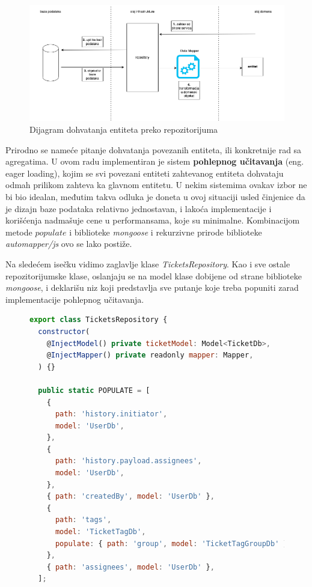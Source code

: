 \documentclass[12pt,oneside]{memoir}
\begin{document}
\begin{figure}[h]
  \centering
  \includegraphics[width=1\textwidth]{docs/images/ch_2/repository.png} 
  \caption{Dijagram dohvatanja entiteta preko repozitorijuma}
  \label{fig:sample}
\end{figure}

Prirodno se nameće pitanje dohvatanja povezanih entiteta, ili konkretnije rad sa agregatima. U ovom radu implementiran je sistem \textbf{pohlepnog učitavanja} (eng. eager loading), kojim se svi povezani entiteti zahtevanog entiteta dohvataju odmah prilikom zahteva ka glavnom entitetu. U nekim sistemima ovakav izbor ne bi bio idealan, međutim takva odluka je doneta u ovoj situaciji usled činjenice da je dizajn baze podataka relativno jednostavan, i lakoća implementacije i korišćenja nadmašuje cene u performansama, koje su minimalne. Kombinacijom metode $populate$ 
 i biblioteke \textit{mongoose} i rekurzivne prirode biblioteke \textit{automapper/js} ovo se lako postiže.

Na sledećem isečku vidimo zaglavlje klase \textit{TicketsRepository}. Kao i sve ostale repozitorijumske klase, oslanjaju se na model klase dobijene od strane biblioteke \textit{mongoose}, i deklarišu niz koji predstavlja sve putanje koje treba popuniti zarad implementacije pohlepnog učitavanja.

\begin{figure}[h]
\begin{lstlisting}[language=JavaScript, style=ES6, caption={Fajl \textit{tickets.repository.ts}, konstrukcija i niz POPULATE}]
export class TicketsRepository {
  constructor(
    @InjectModel() private ticketModel: Model<TicketDb>,
    @InjectMapper() private readonly mapper: Mapper,
  ) {}

  public static POPULATE = [
    {
      path: 'history.initiator',
      model: 'UserDb',
    },
    {
      path: 'history.payload.assignees',
      model: 'UserDb',
    },
    { path: 'createdBy', model: 'UserDb' },
    {
      path: 'tags',
      model: 'TicketTagDb',
      populate: { path: 'group', model: 'TicketTagGroupDb' },
    },
    { path: 'assignees', model: 'UserDb' },
  ];
\end{lstlisting}
\end{figure}
\end{document}
